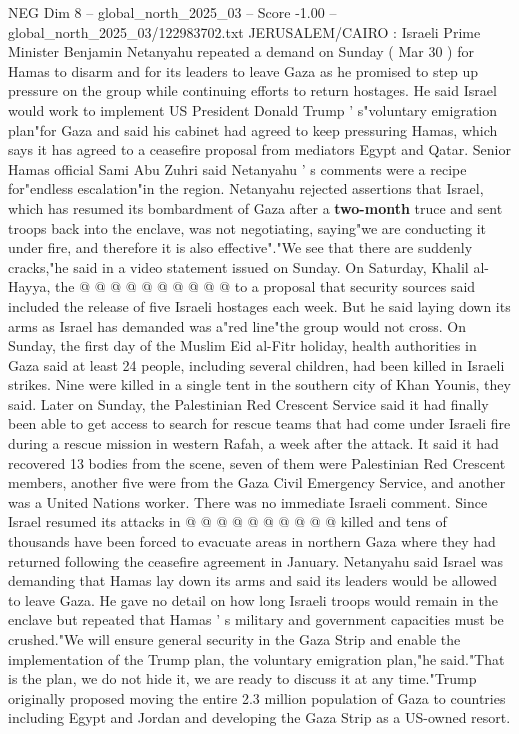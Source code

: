 \begin{textsample}{NEG Dim 8 – global\_north\_2025\_03 – Score -1.00 – global\_north\_2025\_03/122983702.txt}  \label{ex:f8_neg_122}
JERUSALEM/CAIRO : Israeli Prime Minister Benjamin Netanyahu repeated a demand on Sunday ( Mar 30 ) for Hamas to disarm and for its leaders to leave Gaza as he promised to step up pressure on the group while continuing efforts to return hostages.
He said Israel would work to implement US President Donald Trump ' s"voluntary emigration plan"for Gaza and said his cabinet had agreed to keep pressuring Hamas, which says it has agreed to a ceasefire proposal from mediators Egypt and Qatar.
Senior Hamas official Sami Abu Zuhri said Netanyahu ' s comments were a recipe for"endless escalation"in the region.
Netanyahu rejected assertions that Israel, which has resumed its bombardment of Gaza after a \textbf{two-month} truce and sent troops back into the enclave, was not negotiating, saying"we are conducting it under fire, and therefore it is also effective"."We see that there are suddenly cracks,"he said in a video statement issued on Sunday.
On Saturday, Khalil al-Hayya, the @ @ @ @ @ @ @ @ @ @ to a proposal that security sources said included the release of five Israeli hostages each week.
But he said laying down its arms as Israel has demanded was a"red line"the group would not cross.
On Sunday, the first day of the Muslim Eid al-Fitr holiday, health authorities in Gaza said at least 24 people, including several children, had been killed in Israeli strikes.
Nine were killed in a single tent in the southern city of Khan Younis, they said.
Later on Sunday, the Palestinian Red Crescent Service said it had finally been able to get access to search for rescue teams that had come under Israeli fire during a rescue mission in western Rafah, a week after the attack.
It said it had recovered 13 bodies from the scene, seven of them were Palestinian Red Crescent members, another five were from the Gaza Civil Emergency Service, and another was a United Nations worker.
There was no immediate Israeli comment.
Since Israel resumed its attacks in @ @ @ @ @ @ @ @ @ @ killed and tens of thousands have been forced to evacuate areas in northern Gaza where they had returned following the ceasefire agreement in January.
Netanyahu said Israel was demanding that Hamas lay down its arms and said its leaders would be allowed to leave Gaza.
He gave no detail on how long Israeli troops would remain in the enclave but repeated that Hamas ' s military and government capacities must be crushed."We will ensure general security in the Gaza Strip and enable the implementation of the Trump plan, the voluntary emigration plan,"he said."That is the plan, we do not hide it, we are ready to discuss it at any time."Trump originally proposed moving the entire 2.3 million population of Gaza to countries including Egypt and Jordan and developing the Gaza Strip as a US-owned resort.

\end{textsample}
